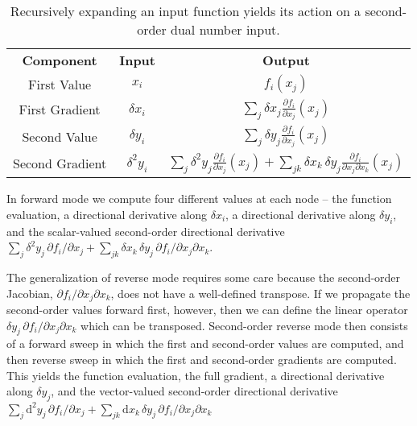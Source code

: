 \begin{table*}[t!]
	\centering
	\renewcommand{\arraystretch}{2}
	\begin{tabular}{ccc}
	\rowcolor[gray]{0.9} \textbf{Component} & \textbf{Input} & \textbf{Output} \\
	First Value & 
	$x_{i}$ & 
	$f_{i} \! \left( x_{j} \right)$ 
	\\
	\rowcolor[gray]{0.9} 
	First Gradient & 
	$\delta x_{i}$ &
	$\displaystyle \sum_{j} \delta x_{j}  \frac{ \partial f_{i} }{ \partial x_{j} } \! \left( x_{j} \right)$
	\\
	Second Value & 
	$\delta y_{i}$ & 
	$\displaystyle \sum_{j} \delta y_{j} \frac{ \partial f_{i} }{ \partial x_{j} } \! \left( x_{j} \right)$
	\\
	\rowcolor[gray]{0.9} 
	Second Gradient & 
	$\delta^{2} y_{i}$ & 
	$\displaystyle \sum_{j} \delta^{2} y_{j} \frac{ \partial f_{i} }{ \partial x_{j} } \! \left( x_{j} \right)
	+ \sum_{jk} \delta x_{k} \, \delta y_{j}
	\frac{ \partial f_{i} }{ \partial x_{j} \partial x_{k} } \! \left( x_{j} \right)$
	\\
	\end{tabular}
	\caption{Recursively expanding an input function yields its action
	on a second-order dual number input.
	\label{tab:secondOrder}}
\end{table*}

In forward mode we compute four different values at each node -- the function
evaluation, a directional derivative along $\delta x_{i}$, a directional derivative
along $\delta y_{i}$, and the scalar-valued second-order directional derivative
$ \sum_{j} \delta^{2} y_{j} \, \partial f_{i} / \partial x_{j}
+ \sum_{jk} \delta x_{k} \, \delta y_{j} \, \partial f_{i} / \partial x_{j} \partial x_{k}$.

The generalization of reverse mode requires some care because the second-order
Jacobian, $\partial f_{i} / \partial x_{j} \partial x_{k}$, does not have a well-defined
transpose.  If we propagate the second-order values forward first, however,
then we can define the linear operator 
$\delta y_{j} \, \partial f_{i} / \partial x_{j} \partial x_{k}$ which can be transposed.
Second-order reverse mode then consists of a forward sweep in which the
first and second-order values are computed, and then reverse sweep in which
the first and second-order gradients are computed.  This yields the function
evaluation, the full gradient, a directional derivative along $\delta y_{j}$, and
the vector-valued second-order directional derivative 
$ \sum_{j} \mathrm{d}^{2} y_{j} \, \partial f_{i} / \partial x_{j}
+ \sum_{jk} \mathrm{d} x_{k} \, \delta y_{j} \, \partial f_{i} / \partial x_{j} \partial x_{k}$

